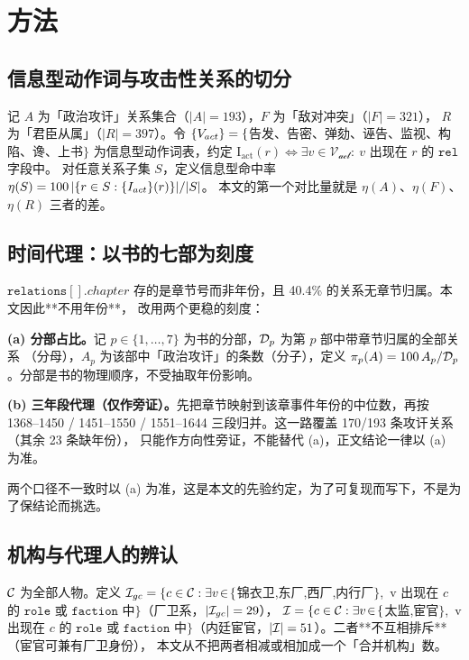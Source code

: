 \section{方法}

\subsection{信息型动作词与攻击性关系的切分}

记 $A$ 为「政治攻讦」关系集合（$|A|=193$），$F$ 为「敌对冲突」（$|F|=321$），
$R$ 为「君臣从属」（$|R|=397$）。令 $\mathcal\{V_{act}\}=\{$告发、告密、弹劾、诬告、监视、构陷、谗、上书$\}$
为信息型动作词表，约定 $\mathrm{I_{act}}(r)\iff\exists v\in\mathcal{V_{act}}:\ v$ 出现在 $r$ 的 $\texttt{rel}$ 字段中。
对任意关系子集 $S$，定义信息型命中率 $\eta(S)=100\,|\{r\in S:\mathrm\{I_{act}\}(r)\}|/|S|$。
本文的第一个对比量就是 $\eta(A)$、$\eta(F)$、$\eta(R)$ 三者的差。

\subsection{时间代理：以书的七部为刻度}

$\texttt{relations}[].chapter$ 存的是章节号而非年份，且 40.4\% 的关系无章节归属。本文因此**不用年份**，
改用两个更稳的刻度：

\textbf{(a) 分部占比。}记 $p\in\{1,\dots,7\}$ 为书的分部，$\mathcal{D}_p$ 为第 $p$ 部中带章节归属的全部关系
（分母），$A_p$ 为该部中「政治攻讦」的条数（分子），定义
$\pi_p(A)=100\,A_p/\mathcal{D}_p$。分部是书的物理顺序，不受抽取年份影响。

\textbf{(b) 三年段代理（仅作旁证）。}先把章节映射到该章事件年份的中位数，再按
1368--1450 / 1451--1550 / 1551--1644 三段归并。这一路覆盖 170/193 条攻讦关系（其余 23 条缺年份），
只能作方向性旁证，不能替代 (a)，正文结论一律以 (a) 为准。

两个口径不一致时以 (a) 为准，这是本文的先验约定，为了可复现而写下，不是为了保结论而挑选。

\subsection{机构与代理人的辨认}

$\mathcal{C}$ 为全部人物。定义
$\mathcal{I}_{{gc}}=\{c\in\mathcal{C} : \exists v\!\in\!\{$锦衣卫,东厂,西厂,内行厂$\}$,\ v 出现在 $c$ 的 $\texttt{role}$ 或
$\texttt{faction}$ 中$\}$（厂卫系，$|\mathcal{I}_{{gc}}|=29$），
$\mathcal{I}=\{c\in\mathcal{C} : \exists v\!\in\!\{$太监,宦官$\}$,\ v 出现在 $c$ 的 $\texttt{role}$ 或
$\texttt{faction}$ 中$\}$（内廷宦官，$|\mathcal{I}|=51$）。二者**不互相排斥**（宦官可兼有厂卫身份），
本文从不把两者相减或相加成一个「合并机构」数。

